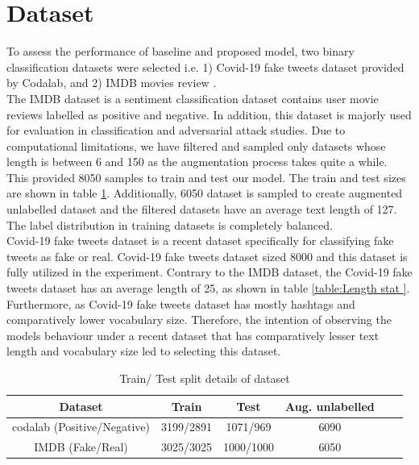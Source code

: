 \documentclass[%
	BCOR=8mm, %
	DIV=12,
	toc=bibliography, %
	toc=listof, %
	oneside, %
	egregdoesnotlikesansseriftitles, %
	]{scrbook}
\begin{document}
\section{Dataset}
\label{label:dataset}
To assess the performance of baseline and proposed model, two binary classification datasets were selected i.e. 1) Covid-19  fake tweets dataset \cite{patwa_fighting_2021} provided by Codalab, and 2) IMDB movies review \cite{maas_learning_2011-1}. \\
The IMDB dataset is a sentiment classification dataset contains user movie reviews labelled as positive and negative. In addition, this dataset is majorly used for evaluation in classification and adversarial attack studies. Due to computational limitations, we have filtered and sampled only datasets whose length is between 6 and 150 as the augmentation process takes quite a while. This provided 8050 samples to train and test our model. The train and test sizes are shown in table \ref{table:train/testtable}. Additionally, 6050 dataset is sampled to create augmented unlabelled dataset and the filtered datasets have an average text length of 127. The label distribution in training datasets is completely balanced.\\
Covid-19 fake tweets dataset is a recent dataset specifically for classifying fake tweets as fake or real. Covid-19 fake tweets dataset sized 8000 and this dataset is fully utilized in the experiment. Contrary to the IMDB dataset, the Covid-19  fake tweets dataset has an average length of 25, as shown in table \ref{table:Length stat }. Furthermore, as Covid-19  fake tweets dataset has mostly hashtags and comparatively lower vocabulary size. Therefore, the intention of observing the models behaviour under a recent dataset that has comparatively lesser text length and vocabulary size led to selecting this dataset.

\begin{table}[!h]
\centering
\begin{tabular}{ |c|c|c|c|c|c| }
\hline
Dataset & Train & Test  & Aug. unlabelled \\
\hline
codalab (Positive/Negative) & 3199/2891 & 1071/969 & 6090 \\
\hline
IMDB (Fake/Real) & 3025/3025 & 1000/1000 & 6050  \\
\hline
\end{tabular}
\caption[Train/Test/Unlabelled details of dataset]{Train/ Test split details of dataset }
\label{table:train/testtable}
\end{table}
\end{document}
